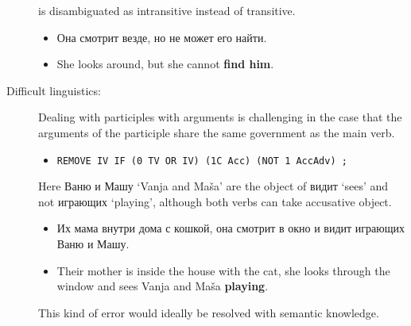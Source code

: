 \documentclass[11pt]{article}
\newcommand{\rus}[1]{\foreignlanguage{russian}{#1}}
\begin{document}
\begin{description}
  is disambiguated as intransitive instead of transitive.
  \begin{itemize}
    \item \rus{Она смотрит везде, но не может его найти.}
    \item She looks around, but she cannot \textbf{find him}.
  \end{itemize}
  \item[ Difficult linguistics:] Dealing with participles with arguments is challenging in the case that the arguments 
    of the participle share the same government as the main verb.
  \begin{itemize}
    \item \texttt{REMOVE IV IF (0 TV OR IV) (1C Acc) (NOT 1 AccAdv) ;}
  \end{itemize}
    Here \rus{Ваню и Машу} `Vanja and Maša' are the object of \rus{видит} `sees' and not \rus{играющих} `playing', although
    both verbs can take accusative object.
  \begin{itemize}
    \item \rus{Их мама внутри дома с кошкой, она смотрит в окно и видит играющих Ваню и Машу.}
    \item Their mother is inside the house with the cat, she looks through the window and sees Vanja and Maša \textbf{playing}.
  \end{itemize}
    This kind of error would ideally be resolved with semantic knowledge. 
\end{description}





\end{document}
